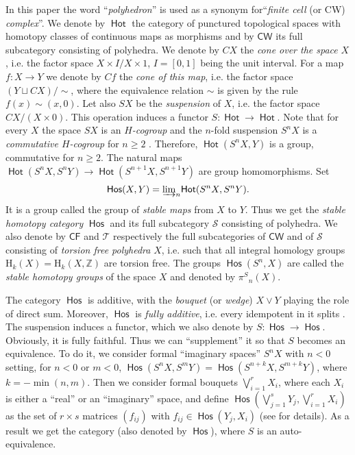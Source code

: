 \documentclass[12pt,a4paper]{amsart}
\theoremstyle{definition}
\theoremstyle{remark}
\numberwithin{equation}{section}
\begin{document}
 In this paper the word ``\emph{polyhedron}'' is used as a synonym for``\emph{finite cell}
 (or CW) \emph{complex}''. We denote by ${\mathop\mathsf{Hot}\nolimits}$ the category of punctured topological spaces
 with homotopy classes of continuous maps as morphisms and by ${\mathsf{CW}}$ its full subcategory
 consisting of polyhedra. We denote by $CX$ the \emph{cone over the space} $X$, i.e. the
 factor space $X{\times} I/X{\times} 1$, $I=[0,1]$ being the unit interval. For a map $f:X\to Y$ we
 denote by $Cf$ the \emph{cone of this map}, i.e. the factor space $(Y\sqcup CX)/\sim$,
 where the equivalence relation $\sim$ is given by the rule $f(x)\sim (x,0)$. Let also $SX$
 be the \emph{suspension} of $X$, i.e. the factor space $CX/(X{\times} 0)$. This operation
 induces a functor $S:{\mathop\mathsf{Hot}\nolimits}\to{\mathop\mathsf{Hot}\nolimits}$. Note that for every $X$ the space $SX$ is an
 \emph{$H$-cogroup} and the $n$-fold suspension $S^nX$ is a \emph{commutative
 $H$-cogroup} for $n\ge2$ \cite[2.21\,--\,2.26]{sw}. Therefore, ${\mathop\mathsf{Hot}\nolimits}(S^nX,Y)$
 is a group, commutative for $n\ge2$. The natural maps
 ${\mathop\mathsf{Hot}\nolimits}(S^nX,S^nY)\to{\mathop\mathsf{Hot}\nolimits}(S^{n+1}X,S^{n+1}Y)$ are group homomorphisms. Set
 \[
  {\mathop\mathsf{Hos}\nolimits}(X,Y)={\varinjlim}_n {\mathop\mathsf{Hot}\nolimits}(S^nX,S^nY).
 \]
 It is a group called the group of \emph{stable maps} from $X$ to $Y$. Thus we get the
 \emph{stable homotopy category} ${\mathop\mathsf{Hos}\nolimits}$ and its full subcategory ${\mathscr S}$ consisting of
 polyhedra. We also denote by ${\mathsf{CF}}$ and ${\mathscr T}$ respectively the full subcategories of ${\mathsf{CW}}$
 and of ${\mathscr S}$ consisting of \emph{torsion free polyhedra} $X$, i.e. such that all integral
 homology groups ${\mathrm H}_k(X)={\mathrm H}_k(X,{\mathbb Z})$ are torsion free. The groups ${\mathop\mathsf{Hos}\nolimits}(S^n,X)$
 are called the \emph{stable homotopy groups} of the space $X$ and denoted by ${\pi^S}_n(X)$.
 
 The category ${\mathop\mathsf{Hos}\nolimits}$ is additive, with the
 \emph{bouquet} (or \emph{wedge}) $X\vee Y$ playing the role of direct sum. Moreover,
 ${\mathop\mathsf{Hos}\nolimits}$ is \emph{fully additive}, i.e. every idempotent in it splits \cite[Theorem~4.8]{co}.
 The suspension induces a functor, which we also denote by $S:{\mathop\mathsf{Hos}\nolimits}\to{\mathop\mathsf{Hos}\nolimits}$. Obviously,
 it is fully faithful. Thus we can ``supplement'' it so that $S$ becomes an equivalence. To do it,
 we consider formal ``imaginary spaces'' $S^nX$ with $n<0$ setting, for $n<0$ or $m<0$,
 ${\mathop\mathsf{Hos}\nolimits}(S^nX,S^mY)= {\mathop\mathsf{Hos}\nolimits}(S^{n+k}X,S^{m+k}Y)$, where $k=-\min(n,m)$. Then we consider
 formal bouquets ${\bigvee}_{i=1}^rX_i$, where each $X_i$ is either a ``real'' or an ``imaginary''
 space, and define ${\mathop\mathsf{Hos}\nolimits}({\bigvee}_{j=1}^sY_j,{\bigvee}_{i=1}^rX_i)$ as the set of $r{\times} s$
 matrices $(f_{ij})$ with $f_{ij}\in{\mathop\mathsf{Hos}\nolimits}(Y_j,X_i)$ (see \cite{co} for details). As a result we
 get the category (also denoted by ${\mathop\mathsf{Hos}\nolimits}$), where $S$ is an auto-equivalence.
\end{document}
